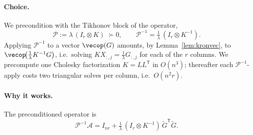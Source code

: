\paragraph{Choice.} We precondition with the Tikhonov block of the operator,
\begin{equation}\label{eq:precond}
  \mathcal P:=\lambda\,(I_r\otimes K)\;\succ0,
  \qquad
  \mathcal P^{-1}=\tfrac1\lambda\,(I_r\otimes K^{-1}).
\end{equation}
Applying $\mathcal P^{-1}$ to a vector $\vecop(G)$ amounts, by
Lemma~\ref{lem:kronvec}, to $\vecop\!\big(\tfrac1\lambda K^{-1}G\big)$, i.e.\ solving
$K X_{:,j}=\tfrac1\lambda G_{:,j}$ for each of the $r$ columns. We precompute one
Cholesky factorization $K=LL^{\mathsf T}$ in $O(n^3)$; thereafter each
$\mathcal P^{-1}$-apply costs two triangular solves per column, i.e.\ $O(n^2r)$.

\paragraph{Why it works.} The preconditioned operator is
\begin{equation}\label{eq:pinvA}
  \mathcal P^{-1}\mathcal A
  = I_{nr}+\tfrac1\lambda\,(I_r\otimes K^{-1})\,\tilde G^{\mathsf T}\tilde G .
\end{equation}

